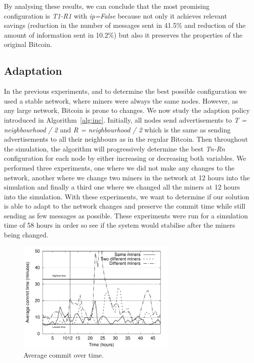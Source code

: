 By analysing these results, we can conclude that the most promising configuration is \textsl{T1-R1} with \textsl{ip=False} because not only it achieves relevant savings (reduction in the number of messages sent in 41.5\% and reduction of the amount of information sent in 10.2\%) but also it preserves the properties of the original Bitcoin.

\subsection{Adaptation}
\label{sec:ea}

In the previous experiments, and to determine the best possible configuration we used a stable network, where miners were always the same nodes. However, as any large network, Bitcoin is prone to changes.
We now study the adaption policy introduced in Algorithm~\ref{alg:inc}.
Initially, all nodes send advertisements to \textsl{T = neighbourhood / 2} and \textsl{R = neighbourhood / 2} which is the same as sending advertisements to all their neighbours as in the regular Bitcoin. Then throughout the simulation, the algorithm will progressively determine the best \textsl{Tn-Rn} configuration for each node by either increasing or decreasing both variables. We performed three experiments, one where we did not make any changes to the network, another where we change two miners in the network at 12 hours into the simulation and finally a third one where we changed all the miners at 12 hours into the simulation. With these experiments, we want to determine if our solution is able to adapt to the network changes and preserve the commit time while still sending as few messages as possible. These experiments were run for a simulation time of 58 hours in order so see if the system would stabilise after the miners being changed.

\begin{figure}[h]
\centering
\includegraphics[width=0.7\textwidth]{plots/commit_over_time.pdf}
\caption{Average commit over time.}
\label{fig:commit-over-time}
\end{figure}

